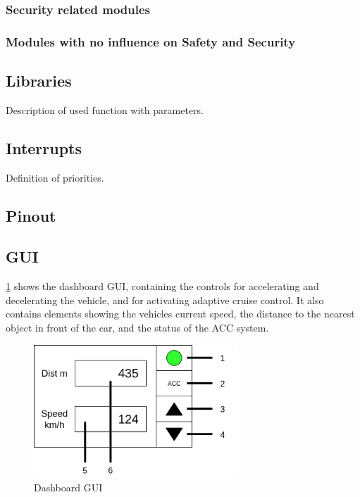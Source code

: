 \subsubsection{Security related modules}

\subsubsection{Modules with no influence on Safety and Security}

\subsection{Libraries}

Description of used function with parameters.


\subsection{Interrupts}

Definition of priorities.

\subsection{Pinout}

\subsection{GUI}

\ref{fig:gui} shows the dashboard GUI, containing the controls for accelerating and decelerating the vehicle, and for activating adaptive cruise control. It also contains elements showing the vehicles current speed, the distance to the nearest object in front of the car, and the status of the ACC system.

\begin{figure}[h]
	\includegraphics[height=50mm]{images/GUI.png}
	\centering
	\caption{Dashboard GUI}
	\label{fig:gui}
\end{figure}

